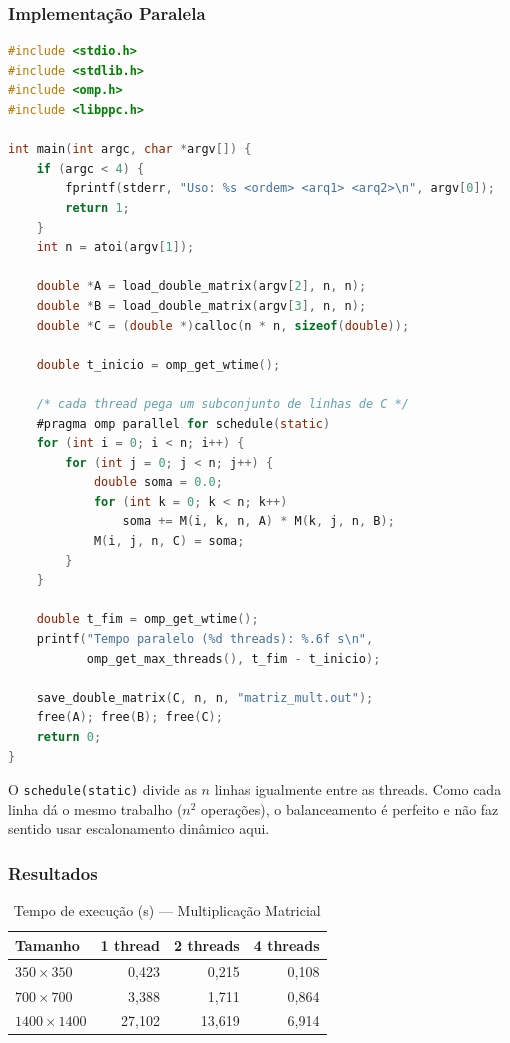 \documentclass[12pt]{article}
\begin{document}
\subsubsection{Implementação Paralela}

\begin{lstlisting}[language=C, caption={Multiplicação matricial paralela}]
#include <stdio.h>
#include <stdlib.h>
#include <omp.h>
#include <libppc.h>

int main(int argc, char *argv[]) {
    if (argc < 4) {
        fprintf(stderr, "Uso: %s <ordem> <arq1> <arq2>\n", argv[0]);
        return 1;
    }
    int n = atoi(argv[1]);

    double *A = load_double_matrix(argv[2], n, n);
    double *B = load_double_matrix(argv[3], n, n);
    double *C = (double *)calloc(n * n, sizeof(double));

    double t_inicio = omp_get_wtime();

    /* cada thread pega um subconjunto de linhas de C */
    #pragma omp parallel for schedule(static)
    for (int i = 0; i < n; i++) {
        for (int j = 0; j < n; j++) {
            double soma = 0.0;
            for (int k = 0; k < n; k++)
                soma += M(i, k, n, A) * M(k, j, n, B);
            M(i, j, n, C) = soma;
        }
    }

    double t_fim = omp_get_wtime();
    printf("Tempo paralelo (%d threads): %.6f s\n",
           omp_get_max_threads(), t_fim - t_inicio);

    save_double_matrix(C, n, n, "matriz_mult.out");
    free(A); free(B); free(C);
    return 0;
}
\end{lstlisting}

O \texttt{schedule(static)} divide as $n$ linhas igualmente entre as threads. Como cada linha dá o mesmo trabalho ($n^2$ operações), o balanceamento é perfeito e não faz sentido usar escalonamento dinâmico aqui.

\subsubsection{Resultados}

\begin{table}[H]
\centering
\caption{Tempo de execução (s) --- Multiplicação Matricial}
\begin{tabular}{lrrr}
\toprule
\textbf{Tamanho} & \textbf{1 thread} & \textbf{2 threads} & \textbf{4 threads} \\
\midrule
$350\times350$ & 0,423 & 0,215 & 0,108 \\
$700\times700$ & 3,388 & 1,711 & 0,864 \\
$1400\times1400$ & 27,102 & 13,619 & 6,914 \\
\bottomrule
\end{tabular}
\end{table}
\end{document}
